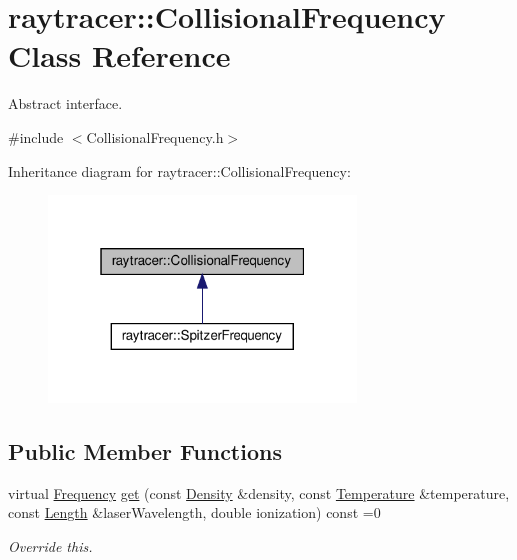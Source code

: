 \hypertarget{classraytracer_1_1CollisionalFrequency}{}\section{raytracer\+:\+:Collisional\+Frequency Class Reference}
\label{classraytracer_1_1CollisionalFrequency}


Abstract interface.  




{\ttfamily \#include $<$Collisional\+Frequency.\+h$>$}



Inheritance diagram for raytracer\+:\+:Collisional\+Frequency\+:
\nopagebreak
\begin{figure}[H]
\begin{center}
\leavevmode
\includegraphics[width=232pt]{classraytracer_1_1CollisionalFrequency__inherit__graph}
\end{center}
\end{figure}
\subsection*{Public Member Functions}
\begin{DoxyCompactItemize}
\item 
virtual \hyperlink{structraytracer_1_1Frequency}{Frequency} \hyperlink{classraytracer_1_1CollisionalFrequency_a85c4e6175a8a692e02be34cdccbf1e16}{get} (const \hyperlink{structraytracer_1_1Density}{Density} \&density, const \hyperlink{structraytracer_1_1Temperature}{Temperature} \&temperature, const \hyperlink{structraytracer_1_1Length}{Length} \&laser\+Wavelength, double ionization) const =0
\begin{DoxyCompactList}\small\item\em Override this. \end{DoxyCompactList}\end{DoxyCompactItemize}


